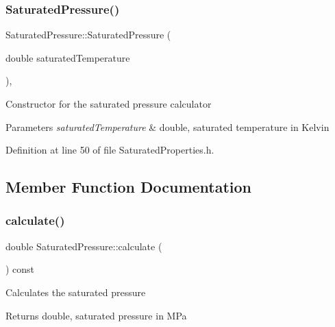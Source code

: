 \mbox{\label{class_saturated_pressure_a67020b0bb7588c643e12e256fa25e0bc}} 
\subsubsection{\texorpdfstring{Saturated\+Pressure()}{SaturatedPressure()}\hspace{0.1cm}{\footnotesize\ttfamily [3/3]}}
{\footnotesize\ttfamily Saturated\+Pressure\+::\+Saturated\+Pressure (\begin{DoxyParamCaption}\item[{double}]{saturated\+Temperature }\end{DoxyParamCaption})\hspace{0.3cm}{\ttfamily [inline]}, {\ttfamily [explicit]}}

Constructor for the saturated pressure calculator 
\begin{DoxyParams}{Parameters}
{\em saturated\+Temperature} & double, saturated temperature in Kelvin \\
\hline
\end{DoxyParams}


Definition at line 50 of file Saturated\+Properties.\+h.



\subsection{Member Function Documentation}
\mbox{\label{class_saturated_pressure_a8ef5357b4f8af1aeaa8dde6ae05b9daa}} 
\subsubsection{\texorpdfstring{calculate()}{calculate()}\hspace{0.1cm}{\footnotesize\ttfamily [1/3]}}
{\footnotesize\ttfamily double Saturated\+Pressure\+::calculate (\begin{DoxyParamCaption}{ }\end{DoxyParamCaption}) const}

Calculates the saturated pressure \begin{DoxyReturn}{Returns}
double, saturated pressure in M\+Pa 
\end{DoxyReturn}


